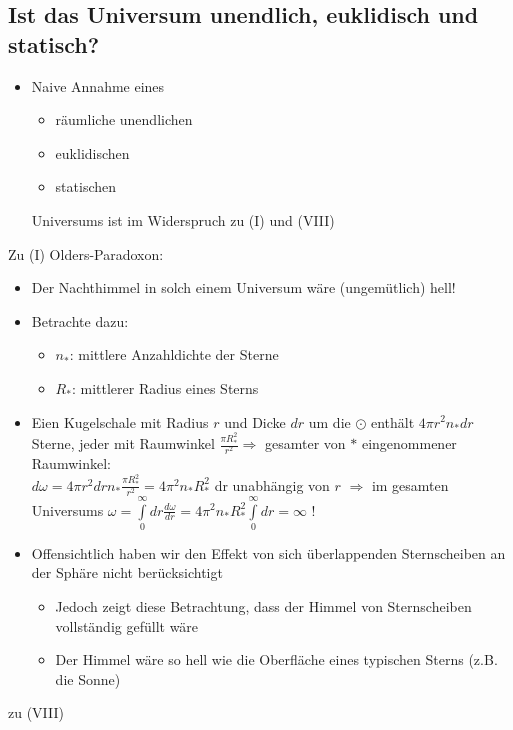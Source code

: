 \subsection{Ist das Universum unendlich, euklidisch und statisch?}
\begin{itemize}
	\item Naive Annahme eines
		\begin{itemize}[label={\textbullet}]
			\item räumliche unendlichen
			\item euklidischen
			\item statischen
		\end{itemize}
		Universums ist im Widerspruch zu (I) und (VIII)
\end{itemize}
Zu (I) Olders-Paradoxon:
\begin{itemize}[label={\textbullet}]
	\item[] Der Nachthimmel in solch einem Universum wäre (ungemütlich) hell!
	\item Betrachte dazu:
		\begin{itemize}[label={}]
			\item $n_\ast$: mittlere Anzahldichte der Sterne
			\item $R_\ast$: mittlerer Radius eines Sterns
		\end{itemize}
	\item Eien Kugelschale mit Radius $r$ und Dicke $dr$ um die $\odot$ enthält $4\pi r^2n_\ast dr$ Sterne, jeder mit Raumwinkel $\frac{\pi R^2_\ast}{r^2}\Rightarrow $ gesamter von $\ast$ eingenommener Raumwinkel:\\
	$d\omega = 4\pi r^2drn_\ast\frac{\pi R_\ast^2}{r^2}=4\pi^2n_\ast R_\ast^2$ dr unabhängig von $r$ $\Rightarrow $ im gesamten Universums
		$\omega=\int\limits_0^\infty dr\frac{d\omega}{dr}=4\pi^2n_\ast R_\ast^2\int\limits_0^\infty dr=\infty$ !
	\item Offensichtlich haben wir den Effekt von sich überlappenden Sternscheiben an der Sphäre nicht berücksichtigt
		\begin{itemize}
			\item Jedoch zeigt diese Betrachtung, dass der Himmel von Sternscheiben vollständig gefüllt wäre
			\item Der Himmel wäre so hell wie die Oberfläche eines typischen Sterns (z.B. die Sonne)
		\end{itemize}
\end{itemize}
zu (VIII)
